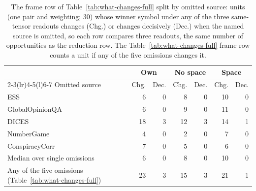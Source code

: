 \begin{table}[t]
\centering\scriptsize
\setlength{\tabcolsep}{2.5pt}
\begin{tabular}{@{}lrrrrrr@{}}
\toprule
& \multicolumn{2}{c}{Own} & \multicolumn{2}{c}{No space} & \multicolumn{2}{c}{Space} \\
\cmidrule(lr){2-3}\cmidrule(lr){4-5}\cmidrule(l){6-7}
Omitted source & Chg. & Dec. & Chg. & Dec. & Chg. & Dec. \\
\midrule
ESS & 6 & 0 & 8 & 0 & 10 & 0 \\
GlobalOpinionQA & 6 & 0 & 9 & 0 & 11 & 0 \\
DICES & 18 & 3 & 12 & 3 & 14 & 1 \\
NumberGame & 4 & 0 & 2 & 0 & 7 & 0 \\
ConspiracyCorr & 7 & 0 & 5 & 0 & 6 & 0 \\
\midrule
Median over single omissions & 6 & 0 & 8 & 0 & 10 & 0 \\
Any of the five omissions (Table~\ref{tab:what-changes-full}) & 23 & 3 & 15 & 3 & 21 & 1 \\
\bottomrule
\end{tabular}
\caption{The frame row of Table~\ref{tab:what-changes-full} split by omitted source: units (one pair and weighting; 30) whose winner symbol under any of the three same-tensor readouts changes (Chg.) or changes decisively (Dec.) when the named source is omitted, so each row compares three readouts, the same number of opportunities as the reduction row. The Table~\ref{tab:what-changes-full} frame row counts a unit if any of the five omissions changes it.}
\label{tab:frame-per-omission}
\end{table}
